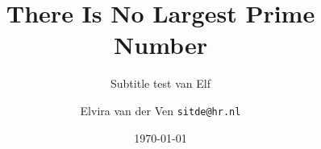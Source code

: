 \documentclass{beamer}
\title{There Is No Largest Prime Number}
\subtitle{Subtitle test van Elf}
\date[TINLABML]{\today}
\author[SITDE]{Elvira van der Ven \texttt{sitde@hr.nl}}
\begin{document}
\begin{frame}
\titlepage
\end{frame}


\end{document}
